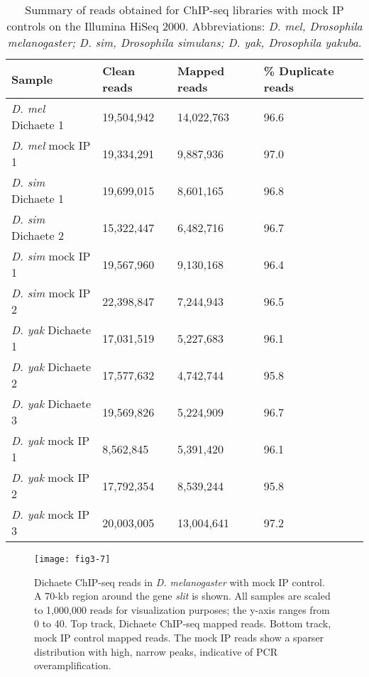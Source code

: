\begin{table}[h]
\centering
\begin{tabular}{|l|l|l|l|}
\hline
\textbf{Sample}            & \textbf{Clean reads} & \textbf{Mapped reads} & \textbf{\% Duplicate reads} \\
\hline
\emph{D. mel} Dichaete 1 & 19,504,942  & 14,022,763   & 96.6               \\ \hline
\emph{D. mel} mock IP 1  & 19,334,291  & 9,887,936    & 97.0                 \\ \hline
\emph{D. sim} Dichaete 1 & 19,699,015  & 8,601,165    & 96.8               \\ \hline
\emph{D. sim} Dichaete 2 & 15,322,447  & 6,482,716    & 96.7               \\ \hline
\emph{D. sim} mock IP 1  & 19,567,960  & 9,130,168    & 96.4               \\ \hline
\emph{D. sim} mock IP 2  & 22,398,847  & 7,244,943    & 96.5               \\ \hline
\emph{D. yak} Dichaete 1 & 17,031,519  & 5,227,683    & 96.1               \\ \hline
\emph{D. yak} Dichaete 2 & 17,577,632  & 4,742,744    & 95.8               \\ \hline
\emph{D. yak} Dichaete 3 & 19,569,826  & 5,224,909    & 96.7               \\ \hline
\emph{D. yak} mock IP 1  & 8,562,845   & 5,391,420    & 96.1               \\ \hline
\emph{D. yak} mock IP 2  & 17,792,354  & 8,539,244    & 95.8               \\ \hline
\emph{D. yak} mock IP 3  & 20,003,005  & 13,004,641   & 97.2               \\ \hline
\end{tabular}
\caption{Summary of reads obtained for ChIP-seq libraries with mock IP controls on the Illumina HiSeq 2000. Abbreviations: \emph{D. mel, Drosophila melanogaster; D. sim, Drosophila simulans; D. yak, Drosophila yakuba}.}
\label{Table 3.2}
\end{table}

\begin{figure}
\centering
\texttt{[image: fig3-7]}
\caption{Dichaete ChIP-seq reads in \emph{D. melanogaster} with mock IP control. A 70-kb region around the gene \emph{slit} is shown. All samples are scaled to 1,000,000 reads for visualization purposes; the y-axis ranges from 0 to 40. Top track, Dichaete ChIP-seq mapped reads. Bottom track, mock IP control mapped reads. The mock IP reads show a sparser distribution with high, narrow peaks, indicative of PCR overamplification.}
\label{Figure 3.7}
\end{figure}

